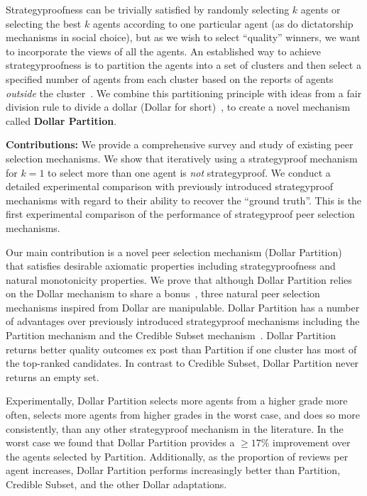 \documentclass[letterpaper]{article}
\newcommand{\citep}{\cite}
\begin{document}
Strategyproofness can be trivially satisfied by randomly selecting $k$ agents or selecting the best $k$ agents according to one particular agent (as do dictatorship mechanisms in social choice), but as we wish to select ``quality'' winners, we want to incorporate the views of all the agents.
An established way to achieve strategyproofness is to partition the agents into a set of clusters and then select a specified number of agents from each cluster based on the reports of agents \emph{outside} the cluster~\citep{AFPT11a}. We combine this partitioning principle with ideas from a fair division rule to divide a dollar (Dollar for short)~\citep{CMT08a}, to create a novel mechanism called \textbf{Dollar Partition}.

\smallskip
\textbf{Contributions:}\;
We provide a comprehensive survey and study of existing peer selection mechanisms.
We show that iteratively using a strategyproof mechanism for $k=1$ to select more than one agent is \emph{not} strategyproof. We conduct a detailed experimental comparison with previously introduced strategyproof mechanisms with regard to their ability to recover the ``ground truth''. This is the first experimental comparison of the performance of strategyproof peer selection mechanisms.

Our main contribution is a novel peer selection mechanism (Dollar Partition) that satisfies desirable axiomatic properties including strategyproofness and natural monotonicity properties. We prove that although Dollar Partition relies on the Dollar mechanism to share a bonus~\citep{CMT08a}, three natural peer selection mechanisms inspired from Dollar are manipulable. Dollar Partition has a number of advantages over previously introduced strategyproof mechanisms including the Partition mechanism and the Credible Subset mechanism~\citep{KLMP15b}. Dollar Partition returns better quality outcomes ex post than Partition if one cluster has most of the top-ranked candidates. In contrast to Credible Subset, Dollar Partition never returns an empty set.

Experimentally, Dollar Partition selects more agents from a higher grade more often, selects more agents from higher grades in the worst case, and does so more consistently, than any other strategyproof mechanism in the literature. In the worst case we found that Dollar Partition provides a $\geq 17\%$ improvement over the agents selected by Partition. Additionally, as the proportion of reviews per agent increases, Dollar Partition performs increasingly better than Partition, Credible Subset, and the other Dollar adaptations.
\end{document}
